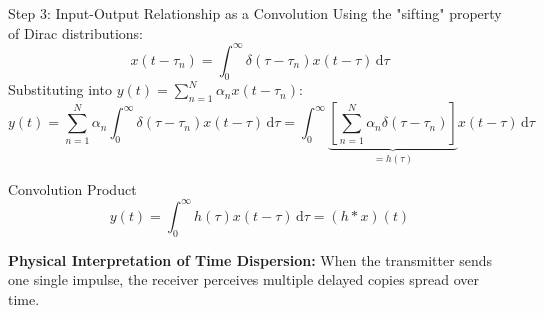 \documentclass[10pt,aspectratio=169]{beamer}
\newcommand{\dd}{\mathrm{d}}
\begin{document}
\begin{frame}{Step 3: Input-Output Relationship as a Convolution}
  Using the "sifting" property of Dirac distributions:
  \begin{equation}
    x(t - \tau_n) = \int_{0}^{\infty} \delta(\tau - \tau_n) x(t - \tau) \,\dd\tau
  \end{equation}
  Substituting into $y(t) = \sum_{n=1}^N \alpha_n x(t - \tau_n)$:
  \begin{equation}
    y(t) = \sum_{n=1}^{N} \alpha_n \int_{0}^{\infty} \delta(\tau - \tau_n) x(t - \tau) \,\dd\tau = \int_{0}^{\infty} \underbrace{\left[ \sum_{n=1}^{N} \alpha_n \delta(\tau - \tau_n) \right]}_{= h(\tau)} x(t - \tau) \,\dd\tau
  \end{equation}

  \begin{block}{Convolution Product}
    \begin{equation}
      \boxed{y(t) = \int_{0}^{\infty} h(\tau) x(t - \tau) \,\dd\tau = (h * x)(t)}
    \end{equation}
  \end{block}
  \textbf{Physical Interpretation of Time Dispersion:}
  When the transmitter sends one single impulse, the receiver perceives multiple delayed copies spread over time.
\end{frame}
\end{document}
